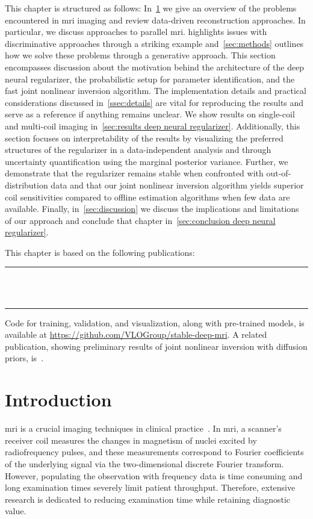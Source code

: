 This chapter is structured as follows:
In~\cref{sec:intro deep neural regularizers} we give an overview of the problems encountered in \gls{mri} imaging and review data-driven reconstruction approaches.
In particular, we discuss approaches to parallel \gls{mri}.
 highlights issues with discriminative approaches through a striking example and~\cref{sec:methods} outlines how we solve these problems through a generative approach.
This section encompasses discussion about the motivation behind the architecture of the deep neural regularizer, the probabilistic setup for parameter identification, and the fast joint nonlinear inversion algorithm.
The implementation details and practical considerations discussed in~\cref{ssec:details} are vital for reproducing the results and serve as a reference if anything remains unclear.
We show results on single-coil and multi-coil imaging in~\cref{sec:results deep neural regularizer}.
Additionally, this section focuses on interpretability of the results by visualizing the preferred structures of the regularizer in a data-independent analysis and through uncertainty quantification using the marginal posterior variance.
Further, we demonstrate that the regularizer remains stable when confronted with out-of-distribution data and that our joint nonlinear inversion algorithm yields superior coil sensitivities compared to offline estimation algorithms when few data are available.
Finally, in~\cref{sec:discussion} we discuss the implications and limitations of our approach and conclude that chapter in~\cref{sec:conclusion deep neural regularizer}.

This chapter is based on the following publications:\\
\rule{\linewidth}{.1em}
\\[.2cm]
\\
\rule{\linewidth}{.1em}
Code for training, validation, and visualization, along with pre-trained models, is available at \href{https://github.com/VLOGroup/stable-deep-mri}{https://github.com/VLOGroup/stable-deep-mri}.
A related publication, showing preliminary results of joint nonlinear inversion with diffusion priors, is~\cite{erlacher23}.
\section{Introduction}
\label{sec:intro deep neural regularizers}
\Gls{mri} is a crucial imaging techniques in clinical practice~\cite{Westbrook2018-pj}.
In \gls{mri}, a scanner's receiver coil measures the changes in magnetism of nuclei excited by radiofrequency pulses, and these measurements correspond to Fourier coefficients of the underlying signal via the two-dimensional discrete Fourier transform.
However, populating the observation with frequency data is time consuming and long examination times severely limit patient throughput.
Therefore, extensive research is dedicated to reducing examination time while retaining diagnostic value.

